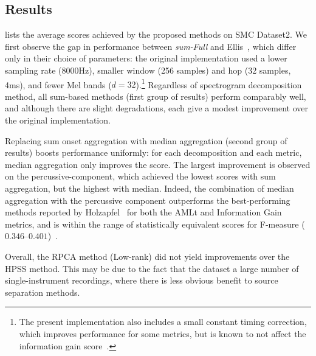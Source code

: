 \documentclass{article}
\begin{document}
\subsection{Results}

 lists the average scores achieved by the proposed methods on
SMC Dataset2. 
We first observe the gap in performance between \emph{sum-Full} and 
Ellis~\cite{ellis2007beat}, which differ only in their choice of parameters: the 
original implementation used a lower sampling rate (8000Hz), smaller window (256 samples) 
and hop (32 samples, 4ms), and fewer Mel bands ($d=32$).\footnote{The present
implementation also includes a small constant timing correction, which improves 
performance for some metrics, but is known to not affect the information gain
score~\cite{davies2009evaluation}.}
Regardless of spectrogram decomposition method, all sum-based methods (first group of 
results) perform comparably well, and although there are slight degradations, each give 
a modest improvement over the original implementation.

Replacing sum onset aggregation with median aggregation (second group of results)
boosts performance uniformly: for each decomposition and each metric, median
aggregation only improves the score.  The largest improvement is observed on the
percussive-component, which achieved the lowest scores with sum aggregation, but the
highest with median. Indeed, the combination of median aggregation with the percussive
component outperforms the best-performing methods reported by Holzapfel~\etal{} for both 
the AMLt and Information Gain metrics, and is within the range of statistically 
equivalent scores for F-measure ($0.346$--$0.401$)~\cite{holzapfel2012}.

Overall, the RPCA method (Low-rank) did not yield improvements over the HPSS method.
This may be due to the fact that the dataset a large number of
single-instrument recordings, where there is less obvious benefit to source separation
methods.  
\end{document}
